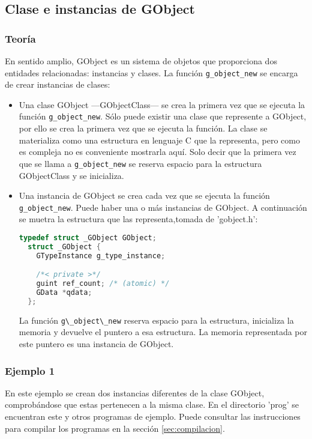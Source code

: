 \subsection{Clase e instancias de \textsf{GObject}} \label{subsec:clase_instancias_gobject}

\subsubsection{Teoría}
En sentido amplio, \textsf{GObject} es un sistema de objetos que proporciona dos entidades relacionadas:
instancias y clases. La función \texttt{g\_object\_new} se encarga de crear instancias de clases:
\begin{itemize}
  \tightlist
\item Una clase \textsf{GObject} ---\textsf{GObjectClass}--- se crea la primera vez que se ejecuta la función
  \texttt{g\_object\_new}. Sólo puede existir una clase que represente a \textsf{GObject}, por ello se crea la
  primera vez que se ejecuta la función.
  La clase se materializa como una estructura en lenguaje C que la representa, pero como es compleja no es
  conveniente mostrarla aquí. Solo decir que la primera vez que se llama a \texttt{g\_object\_new} se reserva
  espacio para la estructura \textsf{GObjectClass} y se inicializa.

\item Una instancia de \textsf{GObject} se crea cada vez que se ejecuta la función
  \texttt{g\_object\_new}. Puede haber una o más instancias de \textsf{GObject}.
  A continuación se muetra la estructura que las representa,tomada de '\textsf{gobject.h}':
\begin{lstlisting}[language=C]
  typedef struct _GObject GObject;
  struct _GObject {
    GTypeInstance g_type_instance;

    /*< private >*/
    guint ref_count; /* (atomic) */
    GData *qdata;
  };
\end{lstlisting}
La función \passthrough{\lstinline!g\_object\_new!} reserva espacio para la estructura, inicializa la
memoria y devuelve el puntero a esa estructura. La memoria representada por este puntero
es una instancia de \textsf{GObject}.
\end{itemize}

\subsubsection{Ejemplo 1}
En este ejemplo se crean dos instancias diferentes de la clase \textsf{GObject}, comprobándose que
estas pertenecen a la misma clase. En el directorio '\textsf{prog}' se encuentran este y otros programas
de ejemplo. Puede consultar las instrucciones para compilar los programas en la sección \ref{sec:compilacion}.

